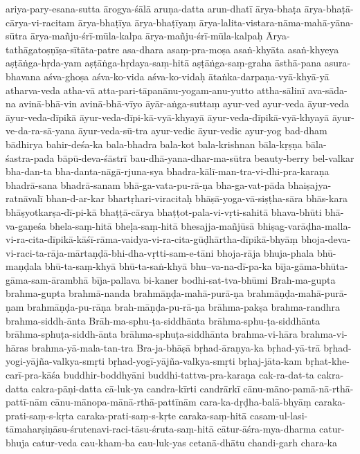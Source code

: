 {ariya-pary-esana-sutta
ārogya-śālā
    aruṇa-datta
arun-dhatī
ārya-bhaṭa
ārya-bhaṭā-cārya-vi-racitam
ārya-bhaṭīya
ārya-bhaṭīyaṃ
ārya-lalita-vistara-nāma-mahā-yāna-sūtra
ārya-mañju-śrī-mūla-kalpa
ārya-mañju-śrī-mūla-kalpaḥ
    Ārya-tathāgatoṣṇīṣa-sītāta-patre 
asa-dhara
asaṃ-pra-moṣa
asaṅ-khyāta
asaṅ-khyeya
    aṣṭāṅga-hṛda-yam
aṣṭāṅga-hṛdaya-saṃ-hitā
aṣṭāṅga-saṃ-graha
    āsthā-pana
asura-bhavana
aśva-ghoṣa
    aśva-ko-vida
    aśva-ko-vidaḥ
ātaṅka-darpaṇa-vyā-khyā-yā
    atharva-veda 
atha-vā
    atta-pari-tāpanānu-yogam-anu-yutto
attha-sālinī
ava-sāda-na
    avinā-bhā-vin
     avinā-bhā-vīyo
āyār-aṅga-suttaṃ
ayur-ved
ayur-veda
āyur-veda
āyur-veda-dīpikā
    āyur-veda-dīpi-kā-vyā-khyayā
āyur-veda-dīpikā-vyā-khyayā
āyur-ve-da-ra-sā-yana
āyur-veda-sū-tra
ayur-vedic
āyur-vedic
ayur-yog
bad-dham
bādhirya
bahir-deśa-ka
bala-bhadra
bala-kot
bala-krishnan
bāla-kṛṣṇa
     bāla-śastra-pada
bāpū-deva-śāstrī
bau-dhā-yana-dhar-ma-sūtra
beauty-berry
bel-valkar
    bha-dan-ta
    bha-danta-nāgā-rjuna-sya
bhadra-kālī-man-tra-vi-dhi-pra-karaṇa
bhadrā-sana
bhadrā-sanam
bhā-ga-vata-pu-rā-ṇa
bha-ga-vat-pāda
bhaiṣajya-ratnāvalī
bhan-d-ar-kar
bhartṛhari-viracitaḥ
bhāṣā-yoga-vā-siṣṭha-sāra
bhās-kara
    bhāṣyotkarṣa-dī-pi-kā 
bhaṭṭā-cārya
bhaṭṭot-pala-vi-vṛti-sahitā
    bhava-bhūti
    bhā-va-gaṇeśa
bhela-saṃ-hitā
bheḷa-saṃ-hitā
    bhesajja-mañjūsā
bhiṣag-varāḍha-malla-vi-ra-cita-dīpikā-kāśī-rāma-vaidya-vi-ra-cita-gūḍhārtha-dīpikā-bhyāṃ
bhoja-deva-vi-raci-ta-rāja-mārtaṇḍā-bhi-dha-vṛtti-sam-e-tāni
bhoja-rāja
bhuja-phala
bhū-maṇḍala
bhū-ta-saṃ-khyā
bhū-ta-saṅ-khyā
bhu--va-na-dī-pa-ka
    bīja-gāma-bhūta-gāma-sam-ārambhā
bīja-pallava
bi-kaner
bodhi-sat-tva-bhūmi
Brah-ma-gupta
brahma-gupta
brahmā-nanda
brahmāṇḍa-mahā-purā-ṇa
brahmāṇḍa-mahā-purā-ṇam
    brahmāṇḍa-pu-rāṇa 
brah-māṇḍa-pu-rā-ṇa
brāhma-pakṣa
brahma-randhra
brahma-siddh-ānta
Brāh-ma-sphu-ṭa-siddhānta
brāhma-sphu-ṭa-siddhānta
brāhma-sphuṭa-siddh-ānta
brāhma-sphuṭa-siddhānta
brahma-vi-hāra
brahma-vi-hāras
brahma-yā-mala-tan-tra
Bra-ja-bhāṣā
bṛhad-āraṇya-ka
bṛhad-yā-trā
bṛhad-yogi-yājña-valkya-smṛti
bṛhad-yogī-yājña-valkya-smṛti
bṛhaj-jāta-kam
bṛhat-khe-carī-pra-kāśa
    buddhir-boddhyāni
buddhi-tattva-pra-karaṇa
cak-ra-dat-ta
cakra-datta
cakra-pāṇi-datta
cā-luk-ya
    candra-kīrti
candrārkī
    cānu-māno-pamā-nā-rthā-pattī-nām 
    cānu-mānopa-mānā-rthā-pattīnām
    cara-ka-dṛḍha-balā-bhyāṃ
caraka-prati-saṃ-s-kṛta
caraka-prati-saṃ-s-kṛte
caraka-saṃ-hitā
casam-ul-lasi-tāmaharṣiṇāsu-śrutenavi-raci-tāsu-śruta-saṃ-hitā
   cātur-āśra-mya-dharma
catur-bhuja
catur-veda
cau-kham-ba
cau-luk-yas
   cetanā-dhātu
chandi-garh
chara-ka
}
